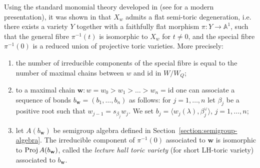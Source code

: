 \documentclass[12pt, a4paper]{amsart}   	%
\numberwithin{equation}{section}
\theoremstyle{plain}
\theoremstyle{definition}
\begin{document}
Using the standard monomial theory developed in \cite{LittelmannPaths3, LLM} (see \cite{CFL1, CFL4} for a modern presentation), 
it was shown in \cite{Chirivi} that $X_w$ admits a flat semi-toric degeneration, i.e.
there exists a variety $Y$ together with a faithfully flat morphism $\pi:Y\rightarrow \mathbb A^1$, such that the general
fibre $\pi^{-1}(t)$ is isomorphic to $X_w$ for $t\not =0$, and the special fibre $\pi^{-1}(0)$ is a reduced union
of projective toric varieties. More precisely:
\begin{enumerate}
\item the number of irreducible components of the special fibre is equal to the number of maximal chains between $w$ and $\mathrm{id}$ in $W/W_Q$;
\item to a maximal chain $\mathbf w: w=w_0>w_{1}>\ldots>w_n=\mathrm{id}$ one can associate a  sequence of bonds $b_\mathbf w=(b_1,\ldots,b_n)$
as follows: for $j=1,\ldots, n$ let $\beta_j$ be a positive root such that $w_{j-1}=s_{\beta_j}w_{j}$. We set $b_j=\langle w_{j}(\lambda),\beta^\vee_j\rangle$,
$j=1,\ldots,n$;
\item 
let $A(b_\mathbf w)$ be semigroup algebra defined in Section~\ref{section:semigroup-algebra}. The irreducible
component of $\pi^{-1}(0)$ associated to $\mathbf w$ is isomorphic to
${\rm Proj\,}A(b_\mathbf w)$, called the \emph{lecture hall toric variety} (for short LH-toric variety) associated to $b_\mathbf w$.
\end{enumerate}
\end{document}
